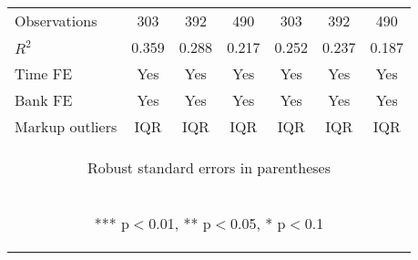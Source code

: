 \documentclass[]{article}
\begin{document}
\begin{center}
\begin{tabular}{lcccccc}
Observations & 303 & 392 & 490 & 303 & 392 & 490 \\
$R^2$ & 0.359 & 0.288 & 0.217 & 0.252 & 0.237 & 0.187 \\
Time FE & Yes & Yes & Yes & Yes & Yes & Yes \\
Bank FE & Yes & Yes & Yes & Yes & Yes & Yes \\
 Markup outliers & IQR & IQR & IQR & IQR & IQR & IQR \\ \hline
\multicolumn{7}{c}{\begin{footnotesize} Robust standard errors in parentheses\end{footnotesize}} \\
\multicolumn{7}{c}{\begin{footnotesize} *** p$<$0.01, ** p$<$0.05, * p$<$0.1\end{footnotesize}} \\
\end{tabular}
\end{center}
\end{document}
